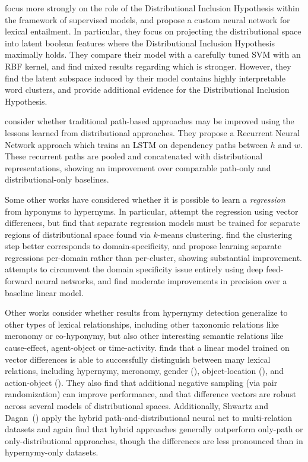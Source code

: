  focus more strongly on the role of the
Distributional Inclusion Hypothesis within the framework of supervised models,
and propose a custom neural network for lexical entailment. In particular, they
focus on projecting the distributional space into latent boolean features where
the Distributional Inclusion Hypothesis maximally holds. They compare their
model with a carefully tuned SVM with an RBF kernel, and find mixed results
regarding which is stronger. However, they find the latent subspace induced
by their model contains highly interpretable word clusters, and provide additional
evidence for the Distributional Inclusion Hypothesis.

 consider whether traditional path-based
approaches may be improved using the lessons learned from distributional
approaches. They propose a Recurrent Neural Network approach which trains
an LSTM \cite{hochreiter:1997:nc} on dependency paths between $h$ and $w$.
These recurrent paths are pooled and concatenated with distributional
representations, showing an improvement over comparable path-only and
distributional-only baselines.

Some other works have considered whether it is possible to learn a {\em
regression} from hyponyms to hypernyms. In particular, 
attempt the regression using vector differences, but find that separate
regression models must be trained for separate regions of distributional
space found via $k$-means clustering.  find
the clustering step better corresponds to domain-specificity, and propose
learning separate regressions per-domain rather than per-cluster, showing
substantial improvement.   attempts to
circumvent the domain specificity issue entirely using deep feed-forward neural
networks, and find moderate improvements in precision over a baseline linear
model.

Other works consider whether results from hypernymy detection generalize to
other types of lexical relationships, including other taxonomic relations
like meronomy or co-hyponymy, but also other interesting semantic relations
like cause-effect, agent-object or time-activity. 
finds that a linear model trained on vector differences is able to successfully
distinguish between many lexical relations, including hypernymy, meronomy,
gender (), object-location (), and
action-object (). They also find that additional negative
sampling (via pair randomization) can improve performance, and that difference
vectors are robust across several models of distributional spaces.
Additionally, Shwartz and Dagan~()
apply the hybrid path-and-distributional neural
net \cite{shwartz:2016:acl} to multi-relation datasets and again find that
hybrid approaches generally outperform only-path or only-distributional
approaches, though the differences are less pronounced than in hypernymy-only
datasets.

